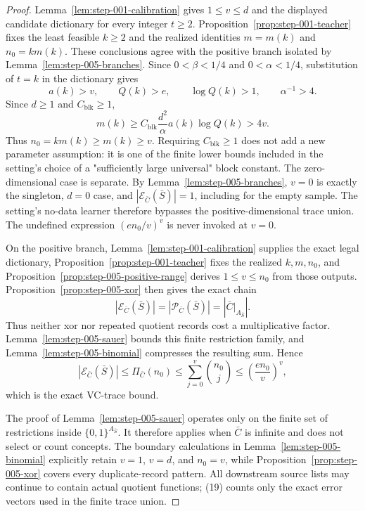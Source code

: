 \begin{proof}
Lemma~\ref{lem:step-001-calibration} gives \(1\le v\le d\) and
the displayed candidate dictionary for every integer \(t\ge2\).
Proposition~\ref{prop:step-001-teacher} fixes the least feasible
\(k\ge2\) and the realized identities \(m=m(k)\) and \(n_0=km(k)\).
These  conclusions agree with the positive branch isolated by
Lemma~\ref{lem:step-005-branches}.  Since \(0<\beta<1/4\) and
\(0<\alpha<1/4\), substitution of \(t=k\) in the  dictionary gives
\[
a(k)>v,\qquad Q(k)>e,\qquad
\log Q(k)>1,\qquad \alpha^{-1}>4.
\]
Since \(d\ge1\) and \(C_{\mathrm{blk}}\ge1\),
\[
m(k)
\ge C_{\mathrm{blk}}\frac{d^2}{\alpha}a(k)\log Q(k)
>4v.
\tag{17}
\]
Thus \(n_0=km(k)\ge m(k)\ge v\).  Requiring
\(C_{\mathrm{blk}}\ge1\) does not add a new parameter assumption: it is one
of the finite lower bounds included in the setting's choice of a
"sufficiently large universal" block constant. 
The zero-dimensional case is separate.  By
Lemma~\ref{lem:step-005-branches}, \(v=0\) is exactly the singleton,
\(d=0\) case, and
\(|\mathcal E_{\bar C}(\bar S)|=1\), including for the empty sample.  The
setting's no-data learner therefore bypasses the positive-dimensional trace
union.  The undefined expression \((e n_0/v)^v\) is never invoked at
\(v=0\).

On the positive branch, Lemma~\ref{lem:step-001-calibration} supplies the
exact legal dictionary, Proposition~\ref{prop:step-001-teacher} fixes the
realized \(k,m,n_0\), and Proposition~\ref{prop:step-005-positive-range} derives
\(1\le v\le n_0\) from those  outputs.  Proposition~\ref{prop:step-005-xor}
then gives the exact chain
\[
|\mathcal E_{\bar C}(\bar S)|
=|\mathcal P_{\bar C}(\bar S)|
=\left|\bar C|_{A_{\bar S}}\right|.
\tag{18}
\]
Thus neither xor nor repeated quotient records cost a multiplicative factor.
Lemma~\ref{lem:step-005-sauer} bounds this finite restriction family, and
Lemma~\ref{lem:step-005-binomial} compresses the resulting sum.  Hence
\[
|\mathcal E_{\bar C}(\bar S)|
\le \Pi_{\bar C}(n_0)
\le \sum_{j=0}^{v}\binom{n_0}{j}
\le \left(\frac{e n_0}{v}\right)^v,
\tag{19}
\]
which is the exact VC-trace bound.

The proof of Lemma~\ref{lem:step-005-sauer} operates only on the finite set
of restrictions inside \(\{0,1\}^{A_{\bar S}}\).  It therefore applies when
\(\bar C\) is infinite and does not select or count concepts.  The boundary
calculations in Lemma~\ref{lem:step-005-binomial} explicitly retain
\(v=1\), \(v=d\), and \(n_0=v\), while
Proposition~\ref{prop:step-005-xor} covers every duplicate-record pattern.
All downstream source lists may continue to contain actual quotient
functions; (19) counts only the exact error vectors used in the finite
trace union.



\end{proof}

